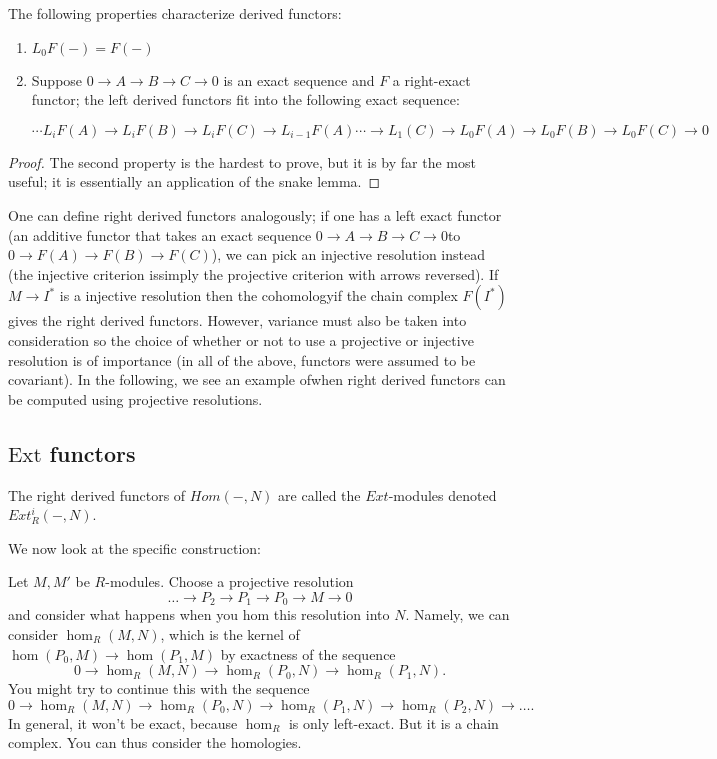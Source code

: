 \begin{theorem} The following properties characterize derived
functors: \begin{enumerate}
\item{ $L_0F(-)=F(-)$ }
\item{ Suppose $0\rightarrow A\rightarrow B\rightarrow
C\rightarrow 0$ is an exact sequence and $F$ a right-exact
functor; the left derived functors fit into the following exact
sequence:

\begin{equation} \cdots L_iF(A)\rightarrow L_iF(B)\rightarrow
L_iF(C)\rightarrow L_{i-1}F(A)\cdots\rightarrow
L_1(C)\rightarrow L_0F(A)\rightarrow L_0F(B)\rightarrow
L_0F(C)\rightarrow 0 \end{equation}}
\end{enumerate}
\end{theorem}
\begin{proof} The second property is the hardest to prove, but
it is by far the most useful; it is essentially an application
of the snake lemma. \end{proof}
One can define right derived functors analogously; if one has a
left exact functor (an additive functor that takes an exact
sequence $0\rightarrow A\rightarrow B\rightarrow C\rightarrow 0$to $0\rightarrow F(A)\rightarrow F(B)\rightarrow F(C)$), we can
pick an injective resolution instead (the injective criterion issimply the projective criterion with arrows reversed). If
$M\rightarrow I^*$ is a injective resolution then the cohomologyif the chain complex $F(I^*)$ gives the right derived functors.
However, variance must also be taken into consideration so the
choice of whether or not to use a projective or injective
resolution is of importance (in all of the above, functors were
assumed to be covariant). In the following, we see an example ofwhen right derived functors can be computed using projective
resolutions.

\newcommand{\ext}{\mathrm{Ext}}
\subsection{$\ext$ functors}

\begin{definition} The right derived functors of $Hom(-,N)$ are
called the $Ext$-modules denoted $Ext^i_R(-,N)$.
\end{definition}
We now look at the specific construction:

Let $M, M'$ be $R$-modules. Choose a projective resolution 
\[ \dots \to P_2 \to P_1 \to P_0 \to M \to 0  \]
and consider what happens when you hom this resolution into $N$.
Namely, we can
consider $\hom_R(M,N)$, which is the kernel of $\hom(P_0, M)
\to\hom(P_1, M) $
by exactness of the sequence
\[ 0 \to \hom_R(M,N) \to \hom_R(P_0, N) \to \hom_R(P_1, N) . \]
You might try to continue this with the sequence
\[ 0 \to \hom_R(M,N) \to \hom_R(P_0, N) \to \hom_R(P_1, N) \to
\hom_R(P_2, N)
\to \dots. \]
In general, it won't be exact, because $\hom_R$ is only
left-exact. But it is a
chain complex. You can thus consider the homologies.

